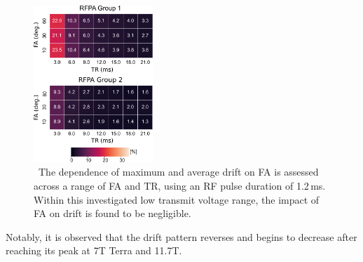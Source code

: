 \begin{figure}
    \centering
    \includegraphics[width=0.4\textwidth]{figures/drift_assesment_table_FA.pdf}
    \caption{\ The dependence of maximum and average drift on FA is assessed across a range of FA and TR, using an RF pulse duration of 1.2\,ms. Within this investigated low transmit voltage range, the impact of FA on drift is found to be negligible.}
    \label{fig:drift_assessment3}
\end{figure}

 Notably, it is observed that the drift pattern reverses and begins to decrease after reaching its peak at 7T Terra and 11.7T.

